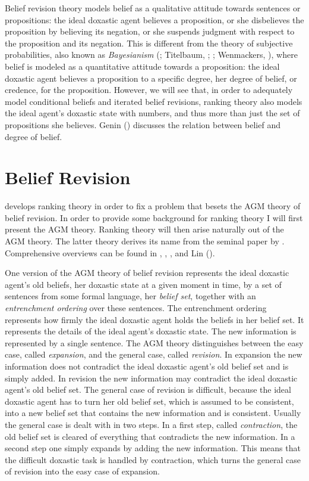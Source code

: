 Belief revision theory models belief as a qualitative attitude towards sentences or propositions: the ideal doxastic agent believes a proposition, or she disbelieves the proposition by believing its negation, or she suspends judgment with respect to the proposition and its negation. This is different from the theory of subjective probabilities, also known as \emph{Bayesianism} (\citealt{e11, e11b}; Titelbaum, ; \citealt{w11}; Wenmackers, ), where belief is modeled as a quantitative attitude towards a proposition: the ideal doxastic agent believes a proposition to a specific degree, her degree of belief, or credence, for the proposition. However, we will see that, in order to adequately model conditional beliefs and iterated belief revisions, ranking theory also models the ideal agent's doxastic state with numbers, and thus more than just the set of propositions she believes. Genin () discusses the relation between belief and degree of belief.

\section{Belief Revision}

\citet{s88,s90} develops ranking theory in order to fix a problem that besets the AGM theory of belief revision. In order to provide some background for ranking theory I will first present the AGM theory. Ranking theory will then arise naturally out of the AGM theory. The latter theory derives its name from the seminal paper by \citet{agm85}. Comprehensive overviews can be found in \citet{g88b}, \citet{gr95}, \citet{r01}, and Lin ().

One version of the AGM theory of belief revision represents the ideal doxastic agent's old beliefs, her doxastic state at a given moment in time, by a set of sentences from some formal language, her \emph{belief set}, together with an \emph{entrenchment ordering} over these sentences. The entrenchment ordering represents how firmly the ideal doxastic agent holds the beliefs in her belief set. It represents the details of the ideal agent's doxastic state. The new information is represented by a single sentence. The AGM theory distinguishes between the easy case, called \emph{expansion}, and the general case, called \emph{revision}. In expansion the new information does not contradict the ideal doxastic agent's old belief set and is simply added. In revision the new information may contradict the ideal doxastic agent's old belief set. The general case of revision is difficult, because the ideal doxastic agent has to turn her old belief set, which is assumed to be consistent, into a new belief set that contains the new information and is consistent. Usually the general case is dealt with in two steps. In a first step, called \emph{contraction}, the old belief set is cleared of everything that contradicts the new information. In a second step one simply expands by adding the new information. This means that the difficult doxastic task is handled by contraction, which turns the general case of revision into the easy case of expansion.

